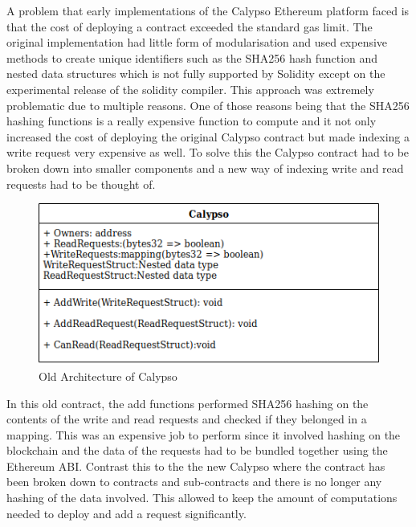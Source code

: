 \documentclass[12pt]{article}
\begin{document}
A problem that early implementations of the Calypso Ethereum platform faced is that the cost of deploying a contract exceeded the standard gas limit. The original implementation had little form of modularisation and used expensive methods to create unique identifiers such as the SHA256 hash function and nested data structures which is not  fully supported by Solidity except on the experimental release of the solidity compiler.  This approach was extremely problematic due to multiple reasons. One of those reasons being that the SHA256 hashing functions is a really expensive function to compute and it not only increased the cost of deploying the original Calypso contract but made indexing a write request very expensive as well. To solve this the Calypso contract had to be broken down into smaller components and a new way of indexing write and read requests had to be thought of.

\begin{figure}[H]
    \centering
    \includegraphics[width=1\textwidth]{OldCalypsoso.png}
    \caption{Old Architecture of Calypso}
    \label{fig:calypsoStructure}
\end{figure}

In this old contract, the add functions performed SHA256 hashing on the contents of the write and read requests and checked if they belonged in  a mapping. This was an expensive job to perform since it involved hashing on the  blockchain and the data of the requests had to be bundled together using the Ethereum ABI. Contrast this to the the new Calypso where the contract has been broken down  to contracts and sub-contracts and there is no longer any hashing of the data involved. This allowed to keep the amount of computations needed to deploy and add a request significantly. 
\end{document}
